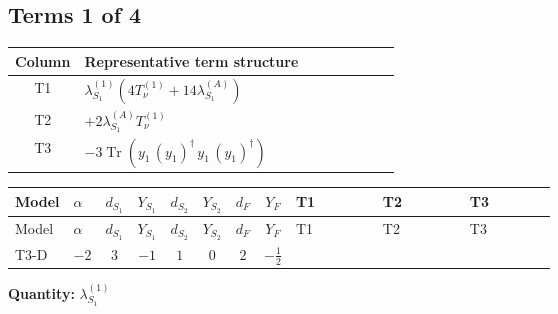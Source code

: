 \documentclass[8pt]{article}
\begin{document}
\begin{landscape}
\subsection*{Terms 1 of 4}
\begin{center}
\begin{tabular}{@{}c >{\raggedright\arraybackslash}p{0.82\linewidth}@{}}
\toprule
Column & Representative term structure \\
\midrule
T1 & \(\displaystyle {\lambda_{S_1}^{(1)}} (4 T_{\nu}^{(1)}+14 {\lambda_{S_1}^{(A)}})\) \\
\midrule
T2 & \(\displaystyle +2 {\lambda_{S_1}^{(A)}} T_{\nu}^{(1)}\) \\
\midrule
T3 & \(\displaystyle -3 \operatorname{Tr}\!\left({y_1}\,\left({y_1}\right)^{\dagger}\,{y_1}\,\left({y_1}\right)^{\dagger}\right)\) \\
\midrule
\bottomrule
\end{tabular}
\end{center}
\smallskip
\tiny
\begin{longtable}{@{}llcccccc >{\raggedright\arraybackslash}p{0.21\linewidth} >{\raggedright\arraybackslash}p{0.21\linewidth} >{\raggedright\arraybackslash}p{0.21\linewidth}@{}}
\toprule
Model & $\alpha$ & $d_{S_1}$ & $Y_{S_1}$ & $d_{S_2}$ & $Y_{S_2}$ & $d_F$ & $Y_F$ & T1 & T2 & T3 \\
\midrule
\endfirsthead
\toprule
Model & $\alpha$ & $d_{S_1}$ & $Y_{S_1}$ & $d_{S_2}$ & $Y_{S_2}$ & $d_F$ & $Y_F$ & T1 & T2 & T3 \\
\midrule
\endhead
T3-D & $-2$ & $3$ & $-1$ & $1$ & $0$ & $2$ & $-\frac{1}{2}$ & \scriptsize\adjustbox{max width=\linewidth}{$\begin{gathered} {\lambda_{S_1}^{(1)}} (4 T_{\nu}^{(1)}+14 {\lambda_{S_1}^{(A)}})\end{gathered}$} & \scriptsize\adjustbox{max width=\linewidth}{$\begin{gathered} +2 {\lambda_{S_1}^{(A)}} T_{\nu}^{(1)}\end{gathered}$} & \scriptsize\adjustbox{max width=\linewidth}{$\begin{gathered} -3 \operatorname{Tr}\!\left({y_1}\,\left({y_1}\right)^{\dagger}\,{y_1}\,\left({y_1}\right)^{\dagger}\right)\end{gathered}$} \\
\midrule
\bottomrule
\end{longtable}
\clearpage
\noindent\textbf{Quantity: }$\lambda_{S_1}^{(1)}$\par\smallskip

\end{landscape}
\end{document}
